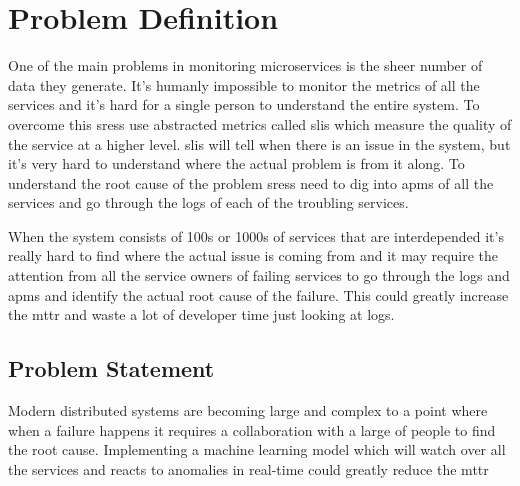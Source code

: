 \section{Problem Definition}

One of the main problems in monitoring microservices is the sheer number of data they generate. It's humanly impossible to monitor the metrics of all the services and it's hard for a single person to understand the entire system. To overcome this \acp{sres} use abstracted metrics called \acp{sli} which measure the quality of the service at a higher level. \acp{sli} will tell when there is an issue in the system, but it's very hard to understand where the actual problem is from it along. To understand the root cause of the problem \acp{sres} need to dig into \acp{apm} of all the services and go through the logs of each of the troubling services.

When the system consists of 100s or 1000s of services that are interdepended it's really hard to find where the actual issue is coming from and it may require the attention from all the service owners of failing services to go through the logs and \acp{apm} and identify the actual root cause of the failure. This could greatly increase the \ac{mttr} and waste a lot of developer time just looking at logs.

\subsection{Problem Statement}

Modern distributed systems are becoming large and complex to a point where when a failure happens it requires a collaboration with a large of people to find the root cause.  Implementing a machine learning model which will watch over all the services and reacts to anomalies in real-time could greatly reduce the \ac{mttr}